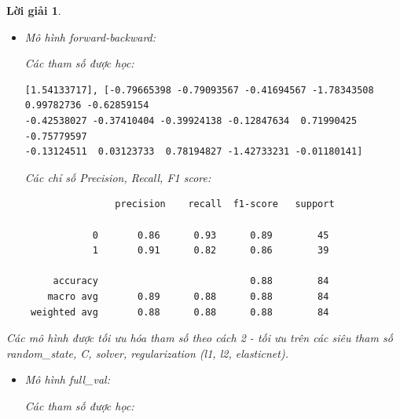 \documentclass[14pt, a4paper]{article}
\theoremstyle{sltheorem}
\theoremstyle{soltheorem}
\newtheorem*{loigiai}{Lời giải}
\begin{document}
\begin{loigiai}
\begin{itemize}
        Các chỉ số Precision, Recall, F1 score:

        \begin{verbatim}
                precision    recall  f1-score   support

            0       0.79      0.93      0.86        45
            1       0.90      0.72      0.80        39
 
     accuracy                           0.83        84
    macro avg       0.85      0.83      0.83        84
 weighted avg       0.84      0.83      0.83        84
        \end{verbatim}

        \item Mô hình forward-backward:
        
        Các tham số được học:

        \begin{verbatim}
[1.54133717], [-0.79665398 -0.79093567 -0.41694567 -1.78343508  0.99782736 -0.62859154
-0.42538027 -0.37410404 -0.39924138 -0.12847634  0.71990425 -0.75779597
-0.13124511  0.03123733  0.78194827 -1.42733231 -0.01180141]
        \end{verbatim}

        Các chỉ số Precision, Recall, F1 score:
        \begin{verbatim}
                precision    recall  f1-score   support

            0       0.86      0.93      0.89        45
            1       0.91      0.82      0.86        39
 
     accuracy                           0.88        84
    macro avg       0.89      0.88      0.88        84
 weighted avg       0.88      0.88      0.88        84
        \end{verbatim}

    \end{itemize}

    
    Các mô hình được tối ưu hóa tham số theo cách 2 - tối ưu trên các siêu tham số random\_state, C, solver, regularization (l1, l2, elasticnet).
    
    \begin{itemize}
        \item Mô hình full\_val:
        
        Các tham số được học:


\end{itemize}
\end{loigiai}
\end{document}
